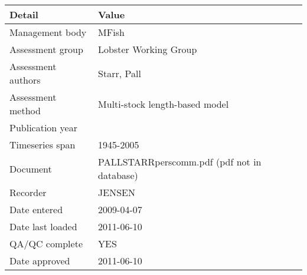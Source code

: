 \begin{table}[htb]
\centering
\begin{tabular}{ll}
\toprule
Detail & Value \\
\midrule
Management body    & MFish                                       \\
Assessment group   & Lobster Working Group                       \\
Assessment authors & Starr, Pall                                 \\
Assessment method  & Multi-stock length-based model              \\
Publication year   &                                             \\
Timeseries span    & 1945-2005                                   \\
Document           & PALLSTARRperscomm.pdf (pdf not in database) \\
Recorder           & JENSEN                                      \\
Date entered       & 2009-04-07                                  \\
Date last loaded   & 2011-06-10                                  \\
QA/QC complete     & YES                                         \\
Date approved      & 2011-06-10                                  \\
\bottomrule
\end{tabular}
\label{tab:assessdet}
\end{table}

